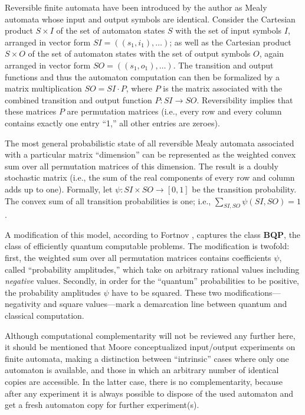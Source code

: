 \documentclass[pre,preprint,showpacs,showkeys,amsfonts]{revtex4}
\begin{document}
Reversible finite automata have been introduced
by the author  \cite{sv-aut-rev,svozil-ql,svozil-2002-kyoto}
as Mealy automata whose input and output symbols are identical.
Consider the Cartesian product $S\times I$ of the set of automaton states $S$
with the set of input symbols $I$, arranged in vector form $SI=((s_1,i_1),\ldots )$;
as well as the Cartesian product $S\times O$ of the set of automaton states
with the set of output symbols $O$, again arranged in vector form $SO=((s_1,o_1),\ldots )$.
The transition and output functions and thus the automaton computation can then be
formalized by a matrix multiplication $SO = SI\cdot P$, where $P$ is the matrix
associated with the combined transition and output function  $P: SI\rightarrow SO$.
Reversibility implies that these matrices $P$ are permutation matrices
(i.e., every row and every column contains exactly one entry ``1,''
all other entries are zeroes).

The most general probabilistic state of all reversible Mealy automata associated with a particular
matrix ``dimension'' can be represented as the weighted convex sum over all permutation
matrices of this dimension. The result is a doubly stochastic matrix (i.e., the sum of the
real components of every row and column adds up to one).
Formally, let $\psi : SI\times SO \rightarrow [0,1]$ be the transition probability.
The convex sum of all transition probabilities is one; i.e., $\sum_{SI,SO}\psi (SI,SO)=1$.

A  modification of this model, according to Fortnov \cite{fortnov-03,be-va},
captures the class {\bf BQP}, the class of efficiently
quantum computable problems. The modification is twofold:
first, the weighted sum over all permutation matrices contains
coefficients $\psi$, called ``probability amplitudes,'' which take on arbitrary rational values
including {\em negative} values.
Secondly, in order for the ``quantum'' probabilities to be positive,
the probability amplitudes $\psi$  have to be squared.
These two modifications---negativity and square values---mark
a demarcation line between quantum and classical computation.


Although computational complementarity will not be reviewed any further here,
it should be mentioned that Moore conceptualized
input/output experiments on finite automata,
making a distinction between ``intrinsic'' cases where only one automaton is available,
and those in which an arbitrary number of identical copies are accessible.
In the latter case, there is no complementarity, because after any experiment
it is always possible to dispose of the used automaton and get a fresh
automaton copy for further experiment(s).
\end{document}
